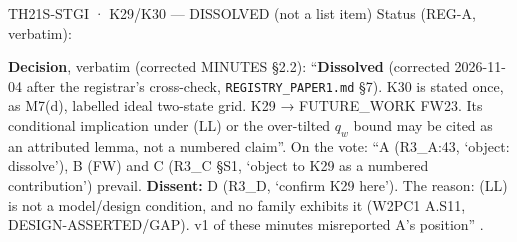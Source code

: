 \begin{card}{TH21}{S-STGI · K29/K30 — DISSOLVED (not a list item)}
Status (REG-A, verbatim):  

\textbf{Decision}, verbatim (corrected MINUTES §2.2): ``\textbf{Dissolved} (corrected 2026-11-04 after the registrar's cross-check, \texttt{REGISTRY\_PAPER1.md} §7). K30 is stated once, as M7(d), labelled ideal two-state grid. K29 → FUTURE\_WORK FW23. Its conditional implication under (LL) or the over-tilted $q_w$ bound may be cited as an attributed lemma, not a numbered claim''. On the vote: ``A (R3\_A:43, `object: dissolve'), B (FW) and C (R3\_C §S1, `object to K29 as a numbered contribution') prevail. \textbf{Dissent:} D (R3\_D, `confirm K29 here'). The reason: (LL) is not a model/design condition, and no family exhibits it (W2PC1 A.S11, DESIGN-ASSERTED/GAP). v1 of these minutes misreported A's position'' .


\end{card}
